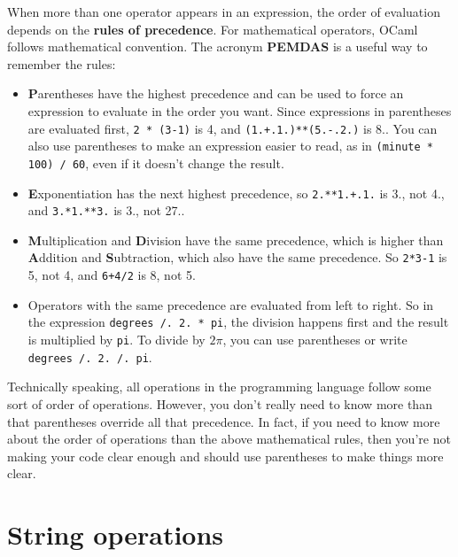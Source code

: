 \documentclass[10pt]{book}
\begin{document}
When more than one operator appears in an expression, the order of
evaluation depends on the {\bf rules of precedence}.  For
mathematical operators, OCaml follows mathematical convention.
The acronym {\bf PEMDAS} is a useful way to
remember the rules:


\begin{itemize}

\item {\bf P}arentheses have the highest precedence and can be used 
to force an expression to evaluate in the order you want. Since
expressions in parentheses are evaluated first, {\tt 2 * (3-1)} is 4,
and {\tt (1.+.1.)**(5.-.2.)} is 8.. You can also use parentheses to make an
expression easier to read, as in {\tt (minute * 100) / 60}, even
if it doesn't change the result.

\item {\bf E}xponentiation has the next highest precedence, so
{\tt 2.**1.+.1.} is 3., not 4., and {\tt 3.*1.**3.} is 3., not 27..

\item {\bf M}ultiplication and {\bf D}ivision have the same precedence,
which is higher than {\bf A}ddition and {\bf S}ubtraction, which also
have the same precedence.  So {\tt 2*3-1} is 5, not 4, and
{\tt 6+4/2} is 8, not 5.

\item Operators with the same precedence are evaluated from left to 
right.  So in the expression {\tt degrees /. 2. * pi}, the division
happens first and the result is multiplied by {\tt pi}.  
To divide by $2 \pi$, you can use parentheses or write {\tt degrees /. 2. /. pi}.

\end{itemize}

Technically speaking, all operations in the programming language follow some sort
of order of operations. However, you don't really need to know more than that 
parentheses override all that precedence. In fact, if you need to know more about
the order of operations than the above mathematical rules, then you're not making
your code clear enough and should use parentheses to make things more clear.

\section{String operations}
\end{document}
